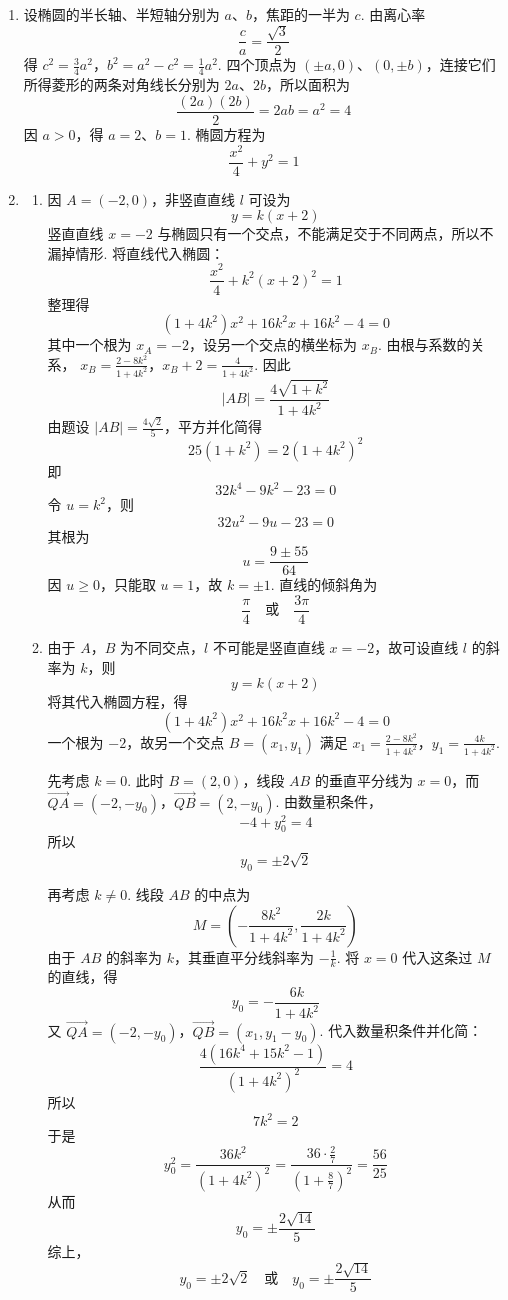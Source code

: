 \begin{solution}
\begin{enumerate}
\item 设椭圆的半长轴、半短轴分别为 \(a\)、\(b\)，焦距的一半为 \(c\). 由离心率
\[
\frac ca=\frac{\sqrt3}{2}
\]
得
\(c^2=\frac34a^2\)，\(b^2=a^2-c^2=\frac14a^2\).
四个顶点为 \((\pm a,0)\)、\((0,\pm b)\)，连接它们所得菱形的两条对角线长分别为 \(2a\)、\(2b\)，所以面积为
\[
\frac{(2a)(2b)}2=2ab=a^2=4
\]
因 \(a>0\)，得 \(a=2\)、\(b=1\). 椭圆方程为
\[
\frac{x^2}{4}+y^2=1
\]

\item
\begin{enumerate}
\item 因 \(A=(-2,0)\)，非竖直直线 \(l\) 可设为
\[
y=k(x+2)
\]
竖直直线 \(x=-2\) 与椭圆只有一个交点，不能满足交于不同两点，所以不漏掉情形. 将直线代入椭圆：
\[
\frac{x^2}{4}+k^2(x+2)^2=1
\]
整理得
\[
(1+4k^2)x^2+16k^2x+16k^2-4=0
\]
其中一个根为 \(x_A=-2\)，设另一个交点的横坐标为 \(x_B\). 由根与系数的关系，
\(x_B=\frac{2-8k^2}{1+4k^2}\)，\(x_B+2=\frac4{1+4k^2}\).
因此
\[
|AB|=\frac{4\sqrt{1+k^2}}{1+4k^2}
\]
由题设 \(|AB|=\frac{4\sqrt2}{5}\)，平方并化简得
\[
25(1+k^2)=2(1+4k^2)^2
\]
即
\[
32k^4-9k^2-23=0
\]
令 \(u=k^2\)，则
\[
32u^2-9u-23=0
\]
其根为
\[
u=\frac{9\pm55}{64}
\]
因 \(u\geqslant0\)，只能取 \(u=1\)，故 \(k=\pm1\). 直线的倾斜角为
\[
\frac{\pi}{4}\quad\text{或}\quad\frac{3\pi}{4}
\]

\item 由于 \(A\)，\(B\) 为不同交点，\(l\) 不可能是竖直直线 \(x=-2\)，故可设直线 \(l\) 的斜率为 \(k\)，则
\[
y=k(x+2)
\]
将其代入椭圆方程，得
\[
(1+4k^2)x^2+16k^2x+16k^2-4=0
\]
一个根为 \(-2\)，故另一个交点 \(B=(x_1,y_1)\) 满足
\(x_1=\frac{2-8k^2}{1+4k^2}\)，\(y_1=\frac{4k}{1+4k^2}\).

先考虑 \(k=0\). 此时 \(B=(2,0)\)，线段 \(AB\) 的垂直平分线为 \(x=0\)，而
\(\overrightarrow{QA}=(-2,-y_0)\)，\(\overrightarrow{QB}=(2,-y_0)\).
由数量积条件，
\[
-4+y_0^2=4
\]
所以
\[
y_0=\pm2\sqrt2
\]

再考虑 \(k\ne0\). 线段 \(AB\) 的中点为
\[
M=\left(-\frac{8k^2}{1+4k^2},\frac{2k}{1+4k^2}\right)
\]
由于 \(AB\) 的斜率为 \(k\)，其垂直平分线斜率为 \(-\frac{1}{k}\). 将 \(x=0\) 代入这条过 \(M\) 的直线，得
\[
y_0=-\frac{6k}{1+4k^2}
\]
又
\(\overrightarrow{QA}=(-2,-y_0)\)，\(\overrightarrow{QB}=(x_1,y_1-y_0)\).
代入数量积条件并化简：
\[
\frac{4(16k^4+15k^2-1)}{(1+4k^2)^2}=4
\]
所以
\[
7k^2=2
\]
于是
\[
y_0^2=\frac{36k^2}{(1+4k^2)^2}
=\frac{36\cdot\frac27}{\left(1+\frac87\right)^2}
=\frac{56}{25}
\]
从而
\[
y_0=\pm\frac{2\sqrt{14}}5
\]
综上，
\[
y_0=\pm2\sqrt2\quad\text{或}\quad y_0=\pm\frac{2\sqrt{14}}5
\]
\end{enumerate}
\end{enumerate}
\end{solution}

